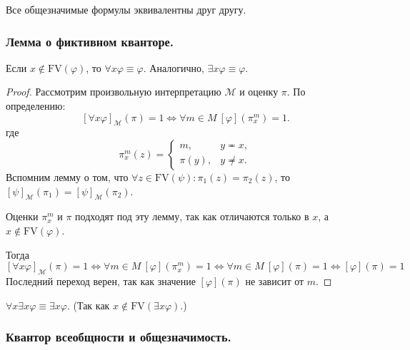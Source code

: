 \documentclass[a4paper, fleqn]{article}
\begin{document}
    \begin{corollary}
        Все общезначимые формулы эквивалентны друг другу.
    \end{corollary}

    \subsubsection{Лемма о фиктивном кванторе.}

    \begin{lemma}
        Если $x \notin \text{FV}(\varphi)$, то $\forall x \varphi \equiv \varphi$.
        Аналогично, $\exists x \varphi \equiv \varphi$.
    \end{lemma}

    \begin{proof}
        Рассмотрим произвольную интерпретацию $\mathcal{M}$ и оценку $\pi$. По определению: 
        \[
            [\forall x \varphi]_{\mathcal{M}}(\pi) = 1 \iff \forall m \in M~ [\varphi](\pi_{x}^{m}) = 1.
        \]
        где 
        \[
            \pi_{x}^{m}(z) = 
            \begin{cases}
                m, & y \eqcirc x,  \\
                \pi(y), & y \not \eqcirc x.
            \end{cases}
        \]
        Вспомним лемму о том, что $\forall z \in \text{FV}(\psi) \colon \pi_{1}(z) = 
        \pi_{2}(z)$, то $[\psi]_{\mathcal{M}}(\pi_{1}) = [\psi]_{\mathcal{M}}(\pi_{2})$.
        
        Оценки $\pi_{x}^{m}$ и $\pi$ подходят под эту лемму, так как отличаются только в $x$, 
        а $x \notin \text{FV}(\varphi)$. 

        Тогда
        \[
            [\forall x \varphi]_{\mathcal{M}}(\pi) = 1 \iff \forall m \in M~ [\varphi](\pi_{x}^{m}) = 1 \iff
            \forall m \in M~ [\varphi](\pi) = 1 \iff [\varphi](\pi) = 1
        \]
        Последний переход верен, так как значение $[\varphi](\pi)$ не зависит от $m$.
    \end{proof}

    \begin{corollary}
        $\forall x \exists x \varphi \equiv \exists x \varphi$. 
        (Так как $x \notin \text{FV}(\exists x \varphi)$.)
    \end{corollary}


    \subsubsection{Квантор всеобщности и общезначимость.}
\end{document}
